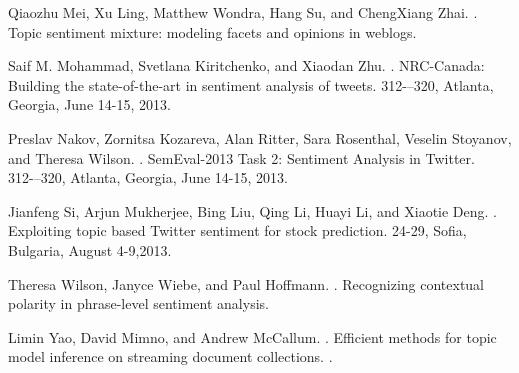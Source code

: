\documentclass[11pt]{article}
\begin{document}
\begin{thebibliography}{}
Qiaozhu Mei, Xu Ling, Matthew Wondra, Hang Su, and ChengXiang Zhai.
.
\newblock Topic sentiment mixture: modeling facets and opinions in weblogs.

Saif M. Mohammad, Svetlana Kiritchenko, and Xiaodan Zhu.
.
\newblock NRC-Canada: Building the state-of-the-art in sentiment analysis of tweets.
312-–320, Atlanta, Georgia, June 14-15, 2013.

Preslav Nakov, Zornitsa Kozareva, Alan Ritter, Sara Rosenthal, Veselin Stoyanov, and Theresa Wilson.
.
\newblock SemEval-2013 Task 2: Sentiment Analysis in Twitter.
312-–320, Atlanta, Georgia, June 14-15, 2013.

Jianfeng Si, Arjun Mukherjee, Bing Liu, Qing Li, Huayi Li, and Xiaotie Deng.
.
\newblock Exploiting topic based Twitter sentiment for stock prediction.
24-29, Sofia, Bulgaria, August 4-9,2013.

Theresa Wilson, Janyce Wiebe, and Paul Hoffmann.
. 
\newblock Recognizing contextual polarity in phrase-level sentiment analysis.

Limin Yao, David Mimno, and Andrew McCallum.
.
\newblock Efficient methods for topic model inference on streaming document collections.
.

\end{thebibliography}
\end{document}
